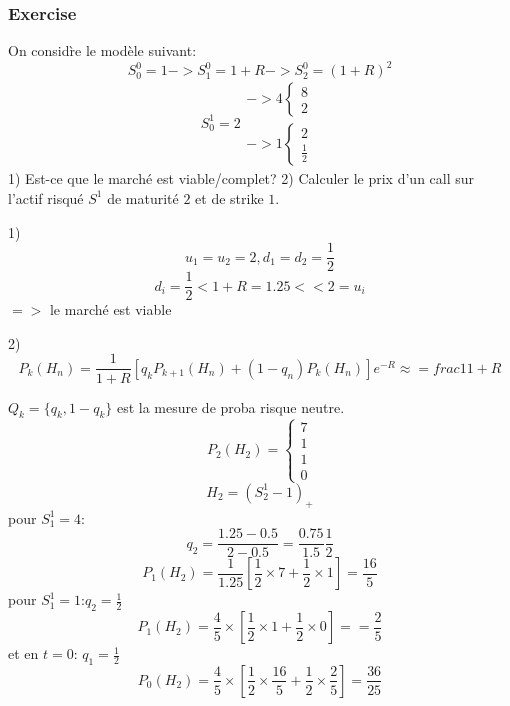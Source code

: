 \documentclass{article}
\begin{document}
\subsubsection{Exercise}
On consid\`re le mod\`ele suivant:
\begin{equation}
S_0^0=1->S_1^0=1+R->S_2^0=(1+R)^2
\end{equation}
\begin{equation}
S_0^1=2
\begin{split}
->4\left\{\begin{array}{l}
8\\
2
\end{array}\right.\\
->1
\left\{\begin{array}{l}
2\\
\frac{1}{2}
\end{array}\right.
\end{split}
\end{equation}
1) Est-ce que le march\'e est viable/complet?
2) Calculer le prix d'un call sur l'actif risqu\'e $S^1$ de maturit\'e $2$ et de strike $1$.

1)
\begin{equation}
u_1=u_2=2, d_1=d_2=\frac{1}{2}
\end{equation}
\begin{equation}
d_i=\frac{1}{2}<1+R=1.25<<2=u_i
\end{equation}
$=>$ le march\'e est viable

2)
\begin{equation}
P_k(H_n)=\frac{1}{1+R}[q_kP_{k+1}(H_n)+(1-q_n)P_{k}(H_n)]e^{-R}\approx=frac{1}{1+R}
\end{equation}

$Q_k=\{q_k,1-q_k\}$ est la mesure de proba risque neutre.
\begin{equation}
P_2(H_2)=
\left\{\begin{array}{r}
7\\
1\\
1\\
0
\end{array}\right.
\end{equation}
\begin{equation}
H_2=(S_2^1-1)_+
\end{equation}
pour $S_1^1=4$:
\begin{equation}
q_2=\frac{1.25-0.5}{2-0.5}=\frac{0.75}{1.5}\frac{1}{2}
\end{equation}
\begin{equation}
P_1(H_2)=\frac{1}{1.25}[\frac{1}{2}\times 7+\frac{1}{2}\times 1]=\frac{16}{5}
\end{equation}
pour $S_1^1=1$:$q_2=\frac{1}{2}$
\begin{equation}
P_1(H_2)=\frac{4}{5}\times[\frac{1}{2}\times 1+\frac{1}{2}\times 0]==\frac{2}{5}
\end{equation}
et en $t=0$: $q_1=\frac{1}{2}$
\begin{equation}
P_0(H_2)=\frac{4}{5}\times[\frac{1}{2}\times\frac{16}{5}+\frac{1}{2}\times\frac{2}{5}]=\frac{36}{25}
\end{equation}
\end{document}
